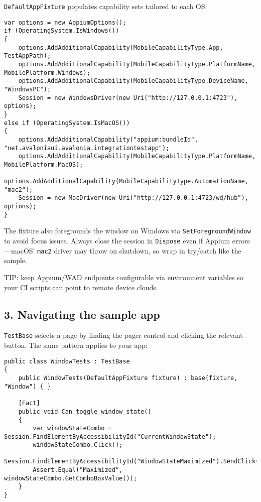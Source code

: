 \passthrough{\lstinline!DefaultAppFixture!} populates capability sets
tailored to each OS:

\begin{lstlisting}
var options = new AppiumOptions();
if (OperatingSystem.IsWindows())
{
    options.AddAdditionalCapability(MobileCapabilityType.App, TestAppPath);
    options.AddAdditionalCapability(MobileCapabilityType.PlatformName, MobilePlatform.Windows);
    options.AddAdditionalCapability(MobileCapabilityType.DeviceName, "WindowsPC");
    Session = new WindowsDriver(new Uri("http://127.0.0.1:4723"), options);
}
else if (OperatingSystem.IsMacOS())
{
    options.AddAdditionalCapability("appium:bundleId", "net.avaloniaui.avalonia.integrationtestapp");
    options.AddAdditionalCapability(MobileCapabilityType.PlatformName, MobilePlatform.MacOS);
    options.AddAdditionalCapability(MobileCapabilityType.AutomationName, "mac2");
    Session = new MacDriver(new Uri("http://127.0.0.1:4723/wd/hub"), options);
}
\end{lstlisting}

The fixture also foregrounds the window on Windows via
\passthrough{\lstinline!SetForegroundWindow!} to avoid focus issues.
Always close the session in \passthrough{\lstinline!Dispose!} even if
Appium errors---macOS' \passthrough{\lstinline!mac2!} driver may throw
on shutdown, so wrap in try/catch like the sample.

TIP: keep Appium/WAD endpoints configurable via environment variables so
your CI scripts can point to remote device clouds.

\subsection{3. Navigating the sample
app}\label{navigating-the-sample-app}

\passthrough{\lstinline!TestBase!} selects a page by finding the pager
control and clicking the relevant button. The same pattern applies to
your app:

\begin{lstlisting}
public class WindowTests : TestBase
{
    public WindowTests(DefaultAppFixture fixture) : base(fixture, "Window") { }

    [Fact]
    public void Can_toggle_window_state()
    {
        var windowStateCombo = Session.FindElementByAccessibilityId("CurrentWindowState");
        windowStateCombo.Click();
        Session.FindElementByAccessibilityId("WindowStateMaximized").SendClick();
        Assert.Equal("Maximized", windowStateCombo.GetComboBoxValue());
    }
}
\end{lstlisting}

